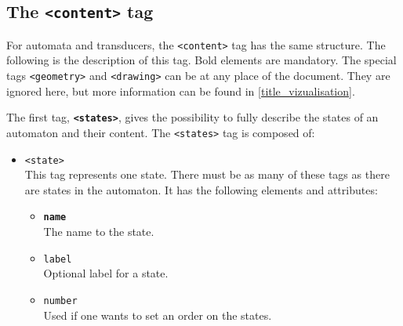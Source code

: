 \documentclass[a4paper]{article}
\newcommand{\xtag}[1]{\texttt{<#1>}}
\newcommand{\xattr}[1]{\texttt{#1}}
\def\contenttag{\xtag{content}}
\def\statestag{\xtag{states}}
\def\statetag{\xtag{state}}
\def\geometrytag{\xtag{geometry}}
\def\drawingtag{\xtag{drawing}}
\begin{document}
\subsection{The \contenttag{} tag}

For automata and transducers, the \contenttag{} tag has the same
structure.  The following is the description of this tag. Bold
elements are mandatory.  The special tags \geometrytag{} and
\drawingtag{} can be at any place of the document. They are ignored
here, but more information can be found in
\autoref{title_vizualisation}.

\medskip

The first tag, \textbf{\statestag{}}, gives the possibility to fully
describe the states of an automaton and their content. The
\statestag{} tag is composed of:
\begin{itemize}
\item \statetag{}\\
  This tag represents one state. There must be as many of these tags
  as there are states in the automaton. It has the following
  elements and attributes:
  \begin{itemize}
  \item \textbf{\xattr{name}}\\
    The name to the state.
  \item \xattr{label}\\
    Optional label for a state.
  \item \xattr{number}\\
    Used if one wants to set an order on the states.~\\
  \end{itemize}
\end{itemize}
\end{document}
